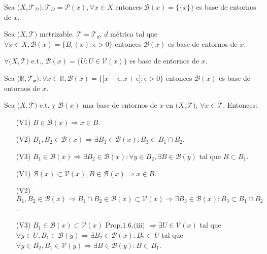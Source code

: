 \begin{ejm}
  Sea $\big( X, \mathcal{T_{D}} \big), \mathcal{T}_{D} = \mathcal{P}(x), \forall x \in X$ entonces $\mathcal{B}(x) =  \{ \{ x \} \}$ es base de entornos de $x$.
\end{ejm}

\begin{ejm}
  Sea $\big( X, \mathcal{T} \big)$ metrizable. $ \mathcal{T} = \mathcal{T}_{d}$, $d$ métrica tal que $\forall x \in X, \mathcal{B}(x) = \{ B_{\epsilon}(x) : \epsilon > 0 \}$ entonces $\mathcal{B}(x)$ es base de entornos de $x$.
\end{ejm}

\begin{ejm}
  $\forall \big( X, \mathcal{T} \big)$ e.t., $ \mathcal{B}(x) = \{  \mathring{U} : U \in \mathcal{V}(x) \}$ es base de entornos de $x$.
\end{ejm}

\begin{ejm}
  Sea $\big( \mathbb{R}, \mathcal{T_{u}} \big) : \forall x \in \mathbb{R}, \mathcal{B}(x) =  \{ \big[ x-\epsilon, x + \epsilon \big] : \epsilon > 0  \}$ entonces $\mathcal{B}(x)$ es base de entornos de $x$.
\end{ejm}

\begin{prop}
  Sea $\big( X, \mathcal{T} \big)$ e.t. y $\mathcal{B}(x)$ una base de entornos de $x$ en $\big( X, \mathcal{T} \big)$, $\forall x \in \mathcal{T}$. Entonces:
  \begin{enumerate}[label=(\roman*)]
    \item [(V1)] $B \in \mathcal{B}(x) \Rightarrow x \in B$.
    \item [(V2)] $B_{1},B_{2} \in \mathcal{B}(x) \Rightarrow \exists B_{3} \in \mathcal{B}(x): B_{3} \subset B_{1} \cap B_{2}$.
    \item [(V3)] $B_{1} \in \mathcal{B}(x) \Rightarrow \exists B_{2} \in \mathcal{B}(x): \forall y \in B_{2}, \exists B \in \mathcal{B}(y)$ tal que $ B \subset B_{1}$.
  \end{enumerate}
\end{prop}

\begin{dem}
  \begin{enumerate}[label=(\roman*)]
    \item [(V1)] $\mathcal{B}(x) \subset \mathcal{V}(x), B \in \mathcal{B}(x) \Rightarrow x \in B$.
    \item [(V2)] $B_{1}, B_{2} \in \mathcal{B}(x) \Rightarrow B_{1} \cap B_{2} \in \mathcal{B}(x) \subset \mathcal{V}(x) \Rightarrow \exists B_{3} \in \mathcal{B}(x): B_{3} \subset B_{1} \cap B_{2}$.
    \item [(V3)] $B_{1} \in \mathcal{B}(x) \subset \mathcal{V}(x) \text{ Prop.1.6.(iii) } \Rightarrow \exists U \in \mathcal{V}(x)$ tal que $\forall y \in U, B_{1} \in \mathcal{B}(y) \Rightarrow \exists B_{2} \in \mathcal{B}(x) : B_{2} \subset U$ tal que $\forall y \in B_{2}, B_{1} \in \mathcal{V}(y) \Rightarrow \exists B \in \mathcal{B}(y): B \subset B_{1}$.
  \end{enumerate}
\end{dem}

